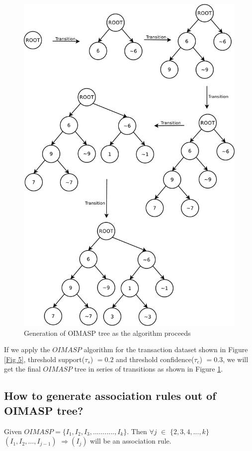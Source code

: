 \documentclass[3p, twocolumn]{elsarticle}
\begin{document}
\begin{figure}
\begin{center}
\includegraphics[scale=0.3]{pdf/transition}
\end{center}
\caption{Generation of OIMASP tree as the algorithm proceeds}
\label{Fig 6}
\end{figure}

If we apply the $ OIMASP $ algorithm for the transaction dataset shown in Figure \ref{Fig 5}, threshold support($ \tau _{s} $) $ = 0.2 $ and threshold confidence($ \tau _{c} $) $ = 0.3 $, we will get the final $ OIMASP $ tree in series of transitions as shown in Figure \ref{Fig 6}.

\subsection{How to generate association rules out of OIMASP tree?}
\begin{rmk}
	Given $ OIMASP = \{I_{1}, I_{2}, I_{3}, ..........., I_{k}\} $. Then $ \forall j $ $ \in $ $ \lbrace 2, 3, 4, 		..., k \rbrace $ $ (I_{1}, I_{2}, ..., I_{j-1})$ $ \Rightarrow (I_{j}) $ will be an association rule.		
\end{rmk}
\end{document}
